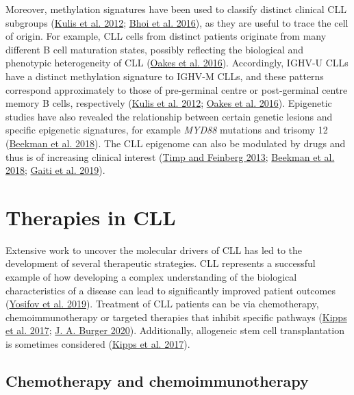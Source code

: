 \documentclass[11pt, a4paper, twosided]{book}
\begin{document}
Moreover, methylation signatures have been used to classify distinct clinical CLL subgroups (\protect\hyperlink{ref-Kulis2012}{Kulis et al. 2012}; \protect\hyperlink{ref-Bhoi2016}{Bhoi et al. 2016}), as they are useful to trace the cell of origin. For example, CLL cells from distinct patients originate from many different B cell maturation states, possibly reflecting the biological and phenotypic heterogeneity of CLL (\protect\hyperlink{ref-Oakes2016}{Oakes et al. 2016}). Accordingly, IGHV-U CLLs have a distinct methylation signature to IGHV-M CLLs, and these patterns correspond approximately to those of pre-germinal centre or post-germinal centre memory B cells, respectively (\protect\hyperlink{ref-Kulis2012}{Kulis et al. 2012}; \protect\hyperlink{ref-Oakes2016}{Oakes et al. 2016}). Epigenetic studies have also revealed the relationship between certain genetic lesions and specific epigenetic signatures, for example \emph{MYD88} mutations and trisomy 12 (\protect\hyperlink{ref-Beekman2018}{Beekman et al. 2018}). The CLL epigenome can also be modulated by drugs and thus is of increasing clinical interest (\protect\hyperlink{ref-Timp2013}{Timp and Feinberg 2013}; \protect\hyperlink{ref-Beekman2018}{Beekman et al. 2018}; \protect\hyperlink{ref-Gaiti2019}{Gaiti et al. 2019}).

\hypertarget{intro-therapies}{%
\section{Therapies in CLL}\label{intro-therapies}}

Extensive work to uncover the molecular drivers of CLL has led to the development of several therapeutic strategies. CLL represents a successful example of how developing a complex understanding of the biological characteristics of a disease can lead to significantly improved patient outcomes (\protect\hyperlink{ref-Yosifov2019}{Yosifov et al. 2019}).
Treatment of CLL patients can be via chemotherapy, chemoimmunotherapy or targeted therapies that inhibit specific pathways (\protect\hyperlink{ref-Kipps2017}{Kipps et al. 2017}; \protect\hyperlink{ref-Burger2020}{J. A. Burger 2020}). Additionally, allogeneic stem cell transplantation is sometimes considered (\protect\hyperlink{ref-Kipps2017}{Kipps et al. 2017}).

\hypertarget{intro-chemotherapy}{%
\subsection{Chemotherapy and chemoimmunotherapy}\label{intro-chemotherapy}}
\end{document}
